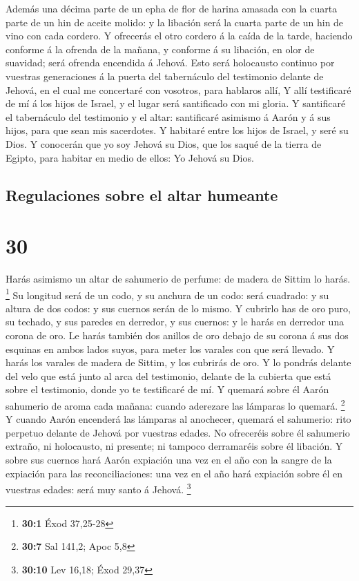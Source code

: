  Además una décima parte de un epha de flor de harina
amasada con la cuarta parte de un hin de aceite molido: y la libación
será la cuarta parte de un hin de vino con cada cordero.  Y
ofrecerás el otro cordero á la caída de la tarde, haciendo conforme á la
ofrenda de la mañana, y conforme á su libación, en olor de suavidad;
será ofrenda encendida á Jehová.  Esto será holocausto
continuo por vuestras generaciones á la puerta del tabernáculo del
testimonio delante de Jehová, en el cual me concertaré con vosotros,
para hablaros allí,  Y allí testificaré de mí á los hijos
de Israel, y el lugar será santificado con mi gloria.  Y
santificaré el tabernáculo del testimonio y el altar: santificaré
asimismo á Aarón y á sus hijos, para que sean mis sacerdotes.
 Y habitaré entre los hijos de Israel, y seré su Dios.
 Y conocerán que yo soy Jehová su Dios, que los saqué de la
tierra de Egipto, para habitar en medio de ellos: Yo Jehová su Dios.

\hypertarget{regulaciones-sobre-el-altar-humeante}{%
\subsection{Regulaciones sobre el altar
humeante}\label{regulaciones-sobre-el-altar-humeante}}

\hypertarget{section-29}{%
\section{30}\label{section-29}}

 Harás asimismo un altar de sahumerio de perfume: de madera
de Sittim lo harás. \footnote{\textbf{30:1} Éxod 37,25-28} 
Su longitud será de un codo, y su anchura de un codo: será cuadrado: y
su altura de dos codos: y sus cuernos serán de lo mismo.  Y
cubrirlo has de oro puro, su techado, y sus paredes en derredor, y sus
cuernos: y le harás en derredor una corona de oro.  Le harás
también dos anillos de oro debajo de su corona á sus dos esquinas en
ambos lados suyos, para meter los varales con que será llevado.
 Y harás los varales de madera de Sittim, y los cubrirás de
oro.  Y lo pondrás delante del velo que está junto al arca
del testimonio, delante de la cubierta que está sobre el testimonio,
donde yo te testificaré de mí.  Y quemará sobre él Aarón
sahumerio de aroma cada mañana: cuando aderezare las lámparas lo
quemará. \footnote{\textbf{30:7} Sal 141,2; Apoc 5,8}  Y
cuando Aarón encenderá las lámparas al anochecer, quemará el sahumerio:
rito perpetuo delante de Jehová por vuestras edades.  No
ofreceréis sobre él sahumerio extraño, ni holocausto, ni presente; ni
tampoco derramaréis sobre él libación.  Y sobre sus cuernos
hará Aarón expiación una vez en el año con la sangre de la expiación
para las reconciliaciones: una vez en el año hará expiación sobre él en
vuestras edades: será muy santo á Jehová. \footnote{\textbf{30:10} Lev
  16,18; Éxod 29,37}

